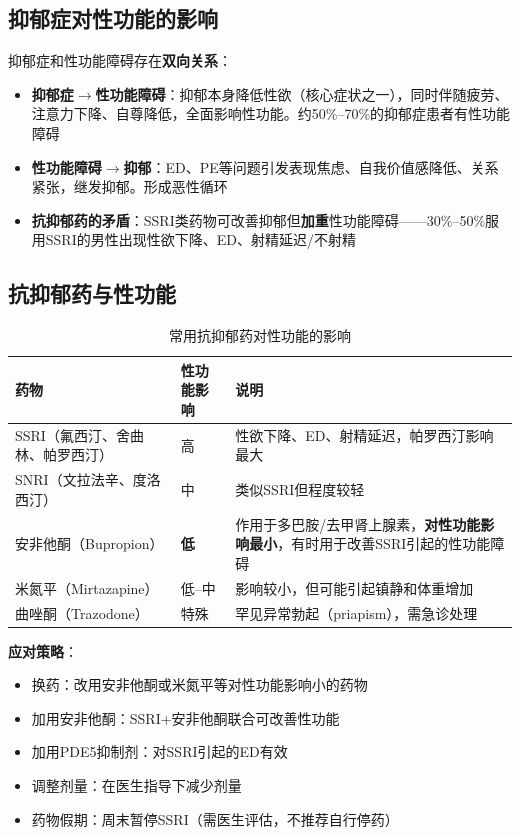 \subsection{抑郁症对性功能的影响}

抑郁症和性功能障碍存在\textbf{双向关系}：

\begin{itemize}[leftmargin=2cm]
	\item \textbf{抑郁症$\rightarrow$性功能障碍}：抑郁本身降低性欲（核心症状之一），同时伴随疲劳、注意力下降、自尊降低，全面影响性功能。约50\%--70\%的抑郁症患者有性功能障碍
	\item \textbf{性功能障碍$\rightarrow$抑郁}：ED、PE等问题引发表现焦虑、自我价值感降低、关系紧张，继发抑郁。形成恶性循环
	\item \textbf{抗抑郁药的矛盾}：SSRI类药物可改善抑郁但\textbf{加重}性功能障碍——30\%--50\%服用SSRI的男性出现性欲下降、ED、射精延迟/不射精
\end{itemize}

\subsection{抗抑郁药与性功能}

\begin{table}[htbp]
\centering
\caption{常用抗抑郁药对性功能的影响}
\label{tab:antidepressants_sexual}
\begin{tabularx}{\textwidth}{@{}llX@{}}
    \toprule
    \textbf{药物} & \textbf{性功能影响} & \textbf{说明} \\
    \midrule
    SSRI（氟西汀、舍曲林、帕罗西汀） & 高 & 性欲下降、ED、射精延迟，帕罗西汀影响最大 \\
    SNRI（文拉法辛、度洛西汀） & 中 & 类似SSRI但程度较轻 \\
    安非他酮（Bupropion） & \textbf{低} & 作用于多巴胺/去甲肾上腺素，\textbf{对性功能影响最小}，有时用于改善SSRI引起的性功能障碍 \\
    米氮平（Mirtazapine） & 低--中 & 影响较小，但可能引起镇静和体重增加 \\
    曲唑酮（Trazodone） & 特殊 & 罕见异常勃起（priapism），需急诊处理 \\
    \bottomrule
\end{tabularx}
\end{table}

\textbf{应对策略}：
\begin{itemize}[leftmargin=2cm]
	\item 换药：改用安非他酮或米氮平等对性功能影响小的药物
	\item 加用安非他酮：SSRI+安非他酮联合可改善性功能
	\item 加用PDE5抑制剂：对SSRI引起的ED有效
	\item 调整剂量：在医生指导下减少剂量
	\item 药物假期：周末暂停SSRI（需医生评估，不推荐自行停药）
\end{itemize}


